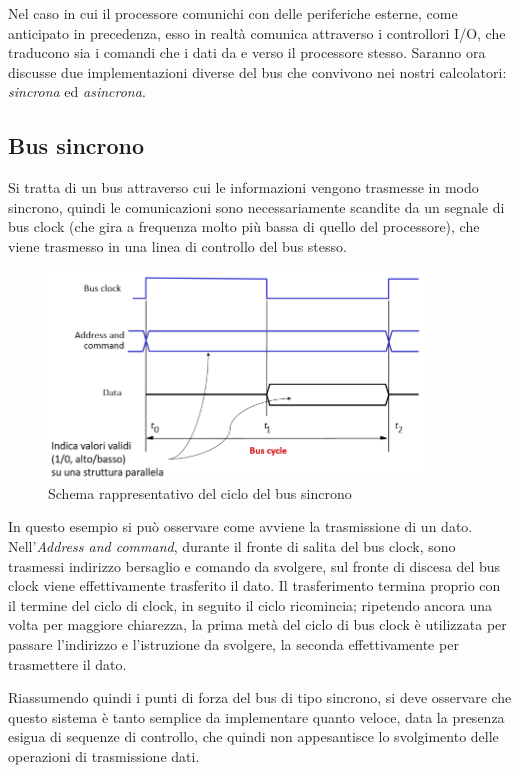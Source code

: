\documentclass[class=book, crop=false, oneside]{standalone}
\begin{document}
Nel caso in cui il processore comunichi con delle periferiche esterne, come anticipato in precedenza, esso in realtà comunica attraverso i controllori I/O, che traducono sia i comandi che i dati da e verso il processore stesso.
Saranno ora discusse due implementazioni diverse del bus che convivono nei nostri calcolatori: \emph{sincrona} ed \emph{asincrona}.

\subsection{Bus sincrono}
Si tratta di un bus attraverso cui le informazioni vengono trasmesse in modo sincrono, quindi le comunicazioni sono necessariamente scandite da un segnale di bus clock (che gira a frequenza molto più bassa di quello del processore), che viene trasmesso in una linea di controllo del bus stesso.

\begin{figure}[H]
	\centering
	\includegraphics[width=0.9\textwidth,keepaspectratio]{bus-sincrono}
	\caption{Schema rappresentativo del ciclo del bus sincrono}
\end{figure}

In questo esempio si può osservare come avviene la trasmissione di un dato. Nell'\emph{Address and command}, durante il fronte di salita del bus clock, sono trasmessi indirizzo bersaglio e comando da svolgere, sul fronte di discesa del bus clock viene effettivamente trasferito il dato.
Il trasferimento termina proprio con il termine del ciclo di clock, in seguito il ciclo ricomincia; ripetendo ancora una volta per maggiore chiarezza, la prima metà del ciclo di bus clock è utilizzata per passare l'indirizzo e l'istruzione da svolgere, la seconda effettivamente per trasmettere il dato.

Riassumendo quindi i punti di forza del bus di tipo sincrono, si deve osservare che questo sistema è tanto semplice da implementare quanto veloce, data la presenza esigua di sequenze di controllo, che quindi non appesantisce lo svolgimento delle operazioni di trasmissione dati.
\end{document}
